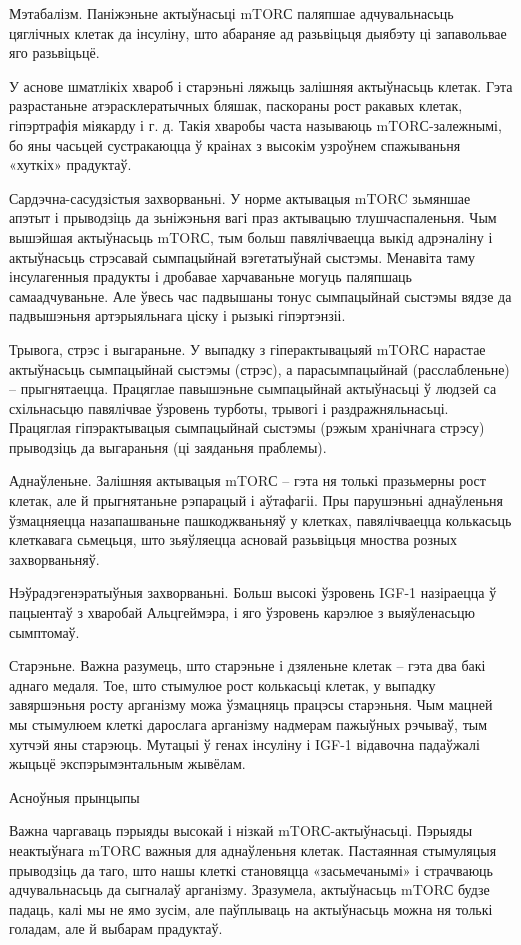 Мэтабалізм.
Паніжэньне актыўнасьці mTORС паляпшае адчувальнасьць цяглічных клетак да інсуліну, што абараняе ад разьвіцьця дыябэту ці запавольвае яго разьвіцьцё.

У аснове шматлікіх хвароб і старэньні ляжыць залішняя актыўнасьць клетак. Гэта разрастаньне атэрасклератычных бляшак, паскораны рост ракавых клетак, гіпэртрафія міякарду і г. д. Такія хваробы часта называюць mTORС-залежнымі, бо яны часьцей сустракаюцца ў краінах з высокім узроўнем спажываньня «хуткіх» прадуктаў.

Сардэчна-сасудзістыя захворваньні.
У норме актывацыя mTORC зьмяншае апэтыт і прыводзіць да зьніжэньня вагі праз актывацыю тлушчаспаленьня. Чым вышэйшая актыўнасьць mTORС, тым больш павялічваецца выкід адрэналіну і актыўнасьць стрэсавай сымпацыйнай вэгетатыўнай сыстэмы. Менавіта таму інсулагенныя прадукты і дробавае харчаваньне могуць паляпшаць самаадчуваньне. Але ўвесь час падвышаны тонус сымпацыйнай сыстэмы вядзе да падвышэньня артэрыяльнага ціску і рызыкі гіпэртэнзіі.

Трывога, стрэс і выгараньне.
У выпадку з гіперактывацыяй mTORС нарастае актыўнасьць сымпацыйнай сыстэмы (стрэс), а парасымпацыйнай (расслабленьне) – прыгнятаецца. Працяглае павышэньне сымпацыйнай актыўнасьці ў людзей са схільнасьцю павялічвае ўзровень турботы, трывогі і раздражняльнасьці. Працяглая гіпэрактывацыя сымпацыйнай сыстэмы (рэжым хранічнага стрэсу) прыводзіць да выгараньня (ці заяданьня праблемы).

Аднаўленьне.
Залішняя актывацыя mTORС – гэта ня толькі празьмерны рост клетак, але й прыгнятаньне рэпарацый і аўтафагіі. Пры парушэньні аднаўленьня ўзмацняецца назапашваньне пашкоджваньняў у клетках, павялічваецца колькасьць клеткавага сьмецьця, што зьяўляецца асновай разьвіцьця мноства розных захворваньняў.

Нэўрадэгенэратыўныя захворваньні.
Больш высокі ўзровень IGF-1 назіраецца ў пацыентаў з хваробай Альцгеймэра, і яго ўзровень карэлюе з выяўленасьцю сымптомаў.

Старэньне.
Важна разумець, што старэньне і дзяленьне клетак – гэта два бакі аднаго медаля. Тое, што стымулюе рост колькасьці клетак, у выпадку завяршэньня росту арганізму можа ўзмацняць працэсы старэньня. Чым мацней мы стымулюем клеткі дарослага арганізму надмерам пажыўных рэчываў, тым хутчэй яны старэюць. Мутацыі ў генах інсуліну і IGF-1 відавочна падаўжалі жыцьцё экспэрымэнтальным жывёлам.

Асноўныя прынцыпы

Важна чаргаваць пэрыяды высокай і нізкай mTORС-актыўнасьці.
Пэрыяды неактыўнага mTORС важныя для аднаўленьня клетак. Пастаянная стымуляцыя прыводзіць да таго, што нашы клеткі становяцца «засьмечанымі» і страчваюць адчувальнасьць да сыгналаў арганізму. Зразумела, актыўнасьць mTORС будзе падаць, калі мы не ямо зусім, але паўплываць на актыўнасьць можна ня толькі голадам, але й выбарам прадуктаў.

